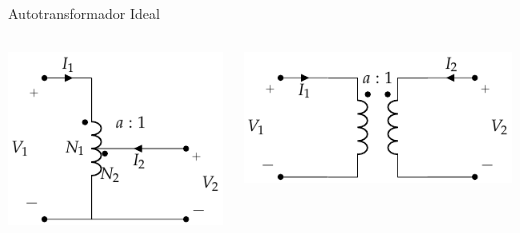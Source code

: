 \documentclass[xcolor={usenames,svgnames,dvipsnames}]{beamer}
\begin{document}
\begin{frame}[label={sec:org5704dc0}]{Autotransformador Ideal}
\begin{columns}
\begin{column}[b]{0.5\columnwidth}
\begin{center}
\includegraphics[width=.9\linewidth]{../figs/AutoTrafoIdeal.pdf}
\end{center}
\end{column}
\begin{column}[b]{0.5\columnwidth}
\begin{center}
\includegraphics[width=.9\linewidth]{../figs/Trafo_Ideal.pdf}
\end{center}
\end{column}
\end{columns}
\end{frame}
\end{document}
